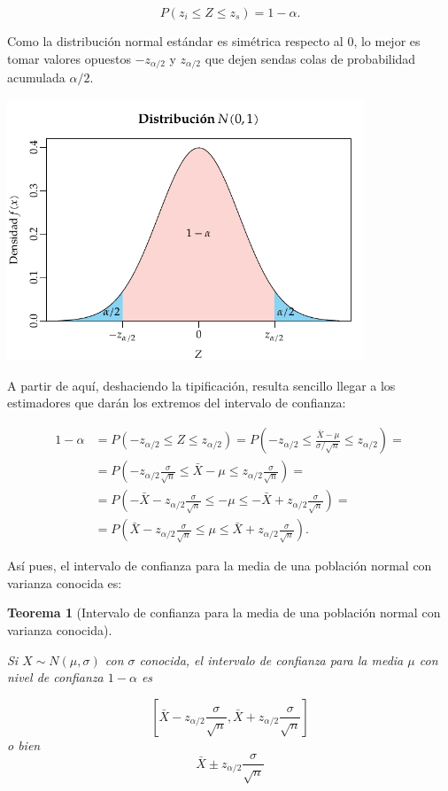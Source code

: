 \documentclass[
  a4paper,
]{scrreport}
\theoremstyle{plain}
\newtheorem{theorem}{Teorema}[chapter]
\theoremstyle{definition}
\theoremstyle{definition}
\theoremstyle{remark}
\begin{document}
\[
P(z_i\leq Z \leq z_s) = 1-\alpha.
\]

Como la distribución normal estándar es simétrica respecto al 0, lo
mejor es tomar valores opuestos \(-z_{\alpha/2}\) y \(z_{\alpha/2}\) que
dejen sendas colas de probabilidad acumulada \(\alpha/2\).

\begin{center}
\includegraphics[width=0.8\textwidth,height=\textheight]{img/estimacion/extremos-intervalo-media-normal.pdf}
\end{center}

A partir de aquí, deshaciendo la tipificación, resulta sencillo llegar a
los estimadores que darán los extremos del intervalo de confianza:

\begin{align*}
1-\alpha &= P(-z_{\alpha/2}\leq Z \leq z_{\alpha/2}) = P\left(-z_{\alpha/2}\leq \frac{\bar X -\mu}{\sigma/\sqrt{n}} \leq z_{\alpha/2}\right) =\\
&= P\left(-z_{\alpha/2}\frac{\sigma}{\sqrt{n}}\leq \bar X -\mu \leq z_{\alpha/2}\frac{\sigma}{\sqrt{n}}\right)=\\
&= P\left(-\bar{X}-z_{\alpha/2}\frac{\sigma}{\sqrt{n}}\leq -\mu \leq -\bar{X}+z_{\alpha/2}\frac{\sigma}{\sqrt{n}}\right)= \\
&= P\left(\bar{X}-z_{\alpha/2}\frac{\sigma}{\sqrt{n}}\leq \mu \leq \bar{X}+z_{\alpha/2}\frac{\sigma}{\sqrt{n}}\right).
\end{align*}

Así pues, el intervalo de confianza para la media de una población
normal con varianza conocida es:

\begin{theorem}[Intervalo de confianza para la media de una población
normal con varianza
conocida]\protect\hypertarget{thm-intervalo-confianza-media-normal-varianza-conocida}{}\label{thm-intervalo-confianza-media-normal-varianza-conocida}

Si \(X\sim N(\mu, \sigma)\) con \(\sigma\) conocida, el \emph{intervalo
de confianza para la media} \(\mu\) con nivel de confianza \(1-\alpha\)
es

\[
\left[\bar{X}-z_{\alpha/2}\frac{\sigma}{\sqrt{n}},\bar{X}+z_{\alpha/2}\frac{\sigma}{\sqrt{n}}\right]
\] o bien \[
\bar{X}\pm z_{\alpha/2}\frac{\sigma}{\sqrt{n}}
\]

\end{theorem}
\end{document}
